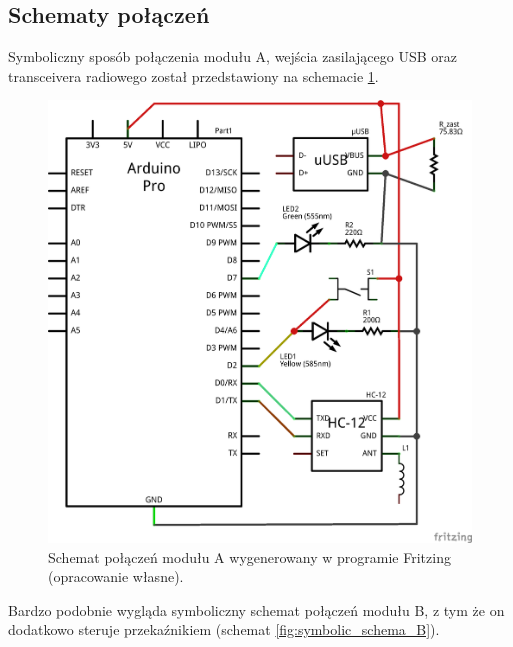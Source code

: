 \subsection{Schematy połączeń}
\label{subsec:schematy_polaczen}

Symboliczny sposób połączenia modułu A, wejścia zasilającego USB oraz transceivera radiowego został przedstawiony na schemacie \ref{fig:symbolic_schema_A}.

\begin{figure}[H]
	\centering
	\includegraphics[scale=0.4]{schemas/schema_moduleA_schem.png}
	\caption{\label{fig:symbolic_schema_A}Schemat połączeń modułu A wygenerowany w programie Fritzing \cite{Fritzing} (opracowanie własne).}
\end{figure}

Bardzo podobnie wygląda symboliczny schemat połączeń modułu B, z tym że on dodatkowo steruje przekaźnikiem (schemat \ref{fig:symbolic_schema_B}).

